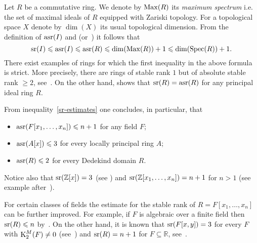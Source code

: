 Let $R$ be a commutative ring. We denote by $\operatorname{Max}(R)$ its \emph{maximum spectrum} i.e. the set of maximal ideals of $R$ equipped with Zariski topology. For a topological space $X$ denote by $\dim(X)$ its usual topological dimension.
From the definition of $\operatorname{asr}(I)$ and \cite[Theorem~2.3]{EO} (or~\cite[Theorem~3.7]{MKV}) it follows that
\begin{equation} \label{sr-estimates} \operatorname{sr}(I)\leqslant\operatorname{asr}(I)\leqslant\operatorname{asr}(R)\leqslant \dim(\operatorname{Max}(R))+1\leqslant\dim(\operatorname{Spec}(R))+1. \end{equation}
There exist examples of rings for which the first inequality in the above formula is strict.
More precisely, there are rings of stable rank $1$ but of absolute stable rank $\geqslant2$, see~\cite{MKV}.
On the other hand, \cite[Theorem~1.3]{MKV} shows that $\operatorname{sr}(R)=\operatorname{asr}(R)$ for any principal ideal ring $R$.
\begin{example}
From inequality~\eqref{sr-estimates} one concludes, in particular, that 
\begin{itemize}
 \item $\operatorname{asr}(F[x_1,\ldots,x_n])\leqslant n+1$ for any field $F$;
 \item $\operatorname{asr}(A[x])\leqslant3$ for every locally principal ring $A$;
 \item $\operatorname{asr}(R)\leqslant2$ for every Dedekind domain $R$.
\end{itemize}
Notice also that $\operatorname{sr}(\mathbb{Z}[x])=3$ (see \cite{GruMenVasSL2ZxSL2kxy}) and $\operatorname{sr}(\mathbb{Z}[x_1,\ldots,x_n])=n+1$ for $n>1$ (see example after~\cite[Theorem~18.2]{VasSusSerreProblem}).

For certain classes of fields the estimate for the stable rank of $R = F[x_1,\ldots, x_n]$ can be further improved.
For example, if $F$ is algebraic over a finite field then $\operatorname{sr}(R)\leqslant n$ by~\cite[Corollary~17.4]{VasSusSerreProblem}.
On the other hand, it is known that $\operatorname{sr}(F[x,y])=3$ for every $F$ with $\operatorname{K}_2^M(F)\neq0$ (see~\cite{KrusenmeyerThesis}) and $\operatorname{sr}(R)=n+1$ for $F\subseteq\mathbb{R}$, see~\cite[Theorem~8]{Va71}.
\end{example}

